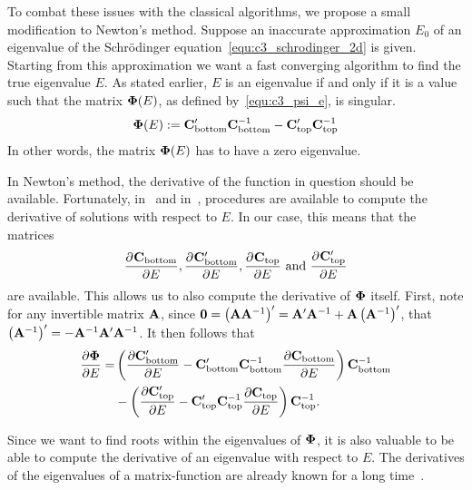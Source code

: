 To combat these issues with the classical algorithms, we propose a small modification to Newton's method. Suppose an inaccurate approximation $E_0$ of an eigenvalue of the Schrödinger equation~\eqref{equ:c3_schrodinger_2d} is given. Starting from this approximation we want a fast converging algorithm to find the true eigenvalue $E$. As stated earlier, $E$ is an eigenvalue if and only if it is a value such that the matrix $\vb{\Phi}(E)$, as defined by~\eqref{equ:c3_psi_e}, is singular.
$$
  \vb{\Phi}(E) := \vb{C}_\text{bottom}'\vb{C}_\text{bottom}^{-1} - \vb{C}_\text{top}'\vb{C}_\text{top}^{-1}
$$
In other words, the matrix $\vb{\Phi}(E)$ has to have a zero eigenvalue.

In Newton's method, the derivative of the function in question should be available. Fortunately, in~\cite{ixaru_lilix_2002} and in~\cite{ledoux_cpmp_2006}, procedures are available to compute the derivative of solutions with respect to $E$. In our case, this means that the matrices
$$
  \pdv[]{\vb{C}_\text{bottom}}{E}, \pdv[]{\vb{C}_\text{bottom}'}{E}, \pdv[]{\vb{C}_\text{top}}{E} \text{ and } \pdv[]{\vb{C}_\text{top}'}{E}
$$
are available. This allows us to also compute the derivative of $\vb{\Phi}$ itself. First, note for any invertible matrix $\vb{A}$, since $\vb{0} = \left(\vb{A}\vb{A}^{-1}\right)' = \vb{A}' \vb{A}^{-1} + \vb{A} \left(\vb{A}^{-1}\right)'$, that $\left(\vb{A}^{-1}\right)' = -\vb{A}^{-1} \vb{A}' \vb{A}^{-1}$. It then follows that
\begin{align*}
  \pdv{\vb{\Phi}}{E} = & \left(\pdv{\vb{C}_\text{bottom}'}{E} - \vb{C}_\text{bottom}'\vb{C}_\text{bottom}^{-1}\pdv{\vb{C}_\text{bottom}}{E}\right) \vb{C}_\text{bottom}^{-1} \\
                       & - \left(\pdv{\vb{C}_\text{top}'}{E} - \vb{C}_\text{top}'\vb{C}_\text{top}^{-1}\pdv{\vb{C}_\text{top}}{E}\right) \vb{C}_\text{top}^{-1}\text{.}
\end{align*}

Since we want to find roots within the eigenvalues of $\vb{\Phi}$, it is also valuable to be able to compute the derivative of an eigenvalue with respect to $E$. The derivatives of the eigenvalues of a matrix-function are already known for a long time~\cite{lancaster_eigenvalues_1964}.

